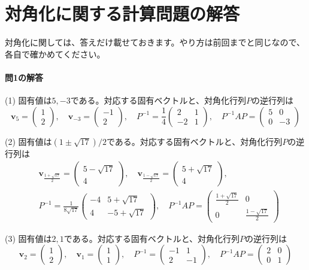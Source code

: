 \section{対角化に関する計算問題の解答}

対角化に関しては、答えだけ載せておきます。やり方は前回までと同じなので、各自で確かめてください。

\paragraph{問1の解答}
(1) 固有値は$5, -3$である。対応する固有ベクトルと、対角化行列$P$の逆行列は
\[
\bm{v}_5 = 
\begin{pmatrix}
1 \\
2
\end{pmatrix}, \quad
\bm{v}_{-3} = 
\begin{pmatrix}
-1 \\
2
\end{pmatrix}, \quad
P^{-1} = 
\frac{1}{4}
\begin{pmatrix}
2 & 1 \\
-2 & 1
\end{pmatrix}, \quad
P^{-1} AP =
\begin{pmatrix}
5 & 0 \\
0 & -3
\end{pmatrix}
\]

(2) 固有値は$(1 \pm \sqrt{17})/2$である。対応する固有ベクトルと、対角化行列$P$の逆行列は
\begin{align*}
&\bm{v}_{\frac{1 + \sqrt{17}}{2}} = 
\begin{pmatrix}
5 - \sqrt{17} \\
4
\end{pmatrix}, \quad
\bm{v}_{\frac{1 - \sqrt{17}}{2}} = 
\begin{pmatrix}
5 + \sqrt{17} \\
4
\end{pmatrix}, \\
& P^{-1} = 
\frac{1}{8\sqrt{17}}
\begin{pmatrix}
-4 & 5 + \sqrt{17} \\
4 & -5 + \sqrt{17}
\end{pmatrix}, \quad
P^{-1} AP =
\begin{pmatrix}
\frac{1 + \sqrt{17}}{2} & 0 \\
0 & \frac{1 - \sqrt{17}}{2}
\end{pmatrix}
\end{align*}

(3) 固有値は$2, 1$である。対応する固有ベクトルと、対角化行列$P$の逆行列は
\[
\bm{v}_2 = 
\begin{pmatrix}
1 \\
2
\end{pmatrix}, \quad
\bm{v}_{1} = 
\begin{pmatrix}
1 \\
1
\end{pmatrix}, \quad
P^{-1} = 
\begin{pmatrix}
-1 & 1 \\
2 & -1
\end{pmatrix}, \quad
P^{-1} AP =
\begin{pmatrix}
2 & 0 \\
0 & 1
\end{pmatrix}
\]

